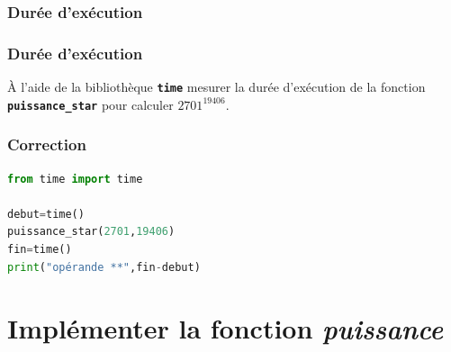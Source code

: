 \documentclass[svgnames,11pt]{beamer}
\begin{document}
\subsubsection{Durée d'exécution}
\begin{frame}
    \frametitle{Durée d'exécution}

\begin{activite}
À l'aide de la bibliothèque \textbf{\texttt{time}} mesurer la durée d'exécution de la fonction \textbf{\texttt{puissance\_star}} pour calculer $2701^{19406}$.
\end{activite}

\end{frame}
\begin{frame}[fragile]
    \frametitle{Correction}

\begin{center}
\begin{lstlisting}[language=Python , basicstyle=\ttfamily\small, xleftmargin=2em, xrightmargin=2em]
from time import time

debut=time()
puissance_star(2701,19406)
fin=time()
print("opérande **",fin-debut)
\end{lstlisting}
\label{CODE}
\end{center}

\end{frame}
\section{Implémenter la fonction \emph{puissance}}
\end{document}
